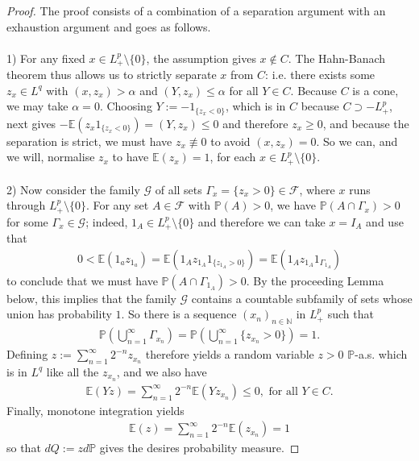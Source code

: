 \documentclass[12pt,a4paper, twoside]{article}
\theoremstyle{definition}
\newcommand{\EE}{\mathbb{E}} %
\newcommand{\PP}{\mathbb{P}} %
\begin{document}
\begin{proof}
The proof consists of a combination of a separation argument with an exhaustion argument and goes as follows. \\
\\
1) For any fixed $x \in L_+^p \setminus \{0\}$, the assumption gives $x \notin C$. The Hahn-Banach theorem thus allows us to strictly separate $x$ from $C$: i.e. there exists some $z_x \in L^q$ with $(x, z_x) > \alpha$ and $(Y, z_x) \leq \alpha$ for all $Y \in C$. Because $C$ is a cone,  we may take $\alpha = 0$. Choosing $Y:= -1_{\{ z_x < 0\}}$, which is in $C$ because $C \supset -L_+^p$, next gives $- \EE(z_x 1_{\{ z_x < 0\}})=(Y,z_x) \leq 0$ and therefore $z_x \geq 0$, and because the separation is strict,  we must have $z_x \not\equiv 0$ to avoid $(x, z_x)=0$. So we can, and we will, normalise $z_x$ to have $\EE(z_x)=1$, for each $x \in L_+^p \setminus \{0\}$. 
\\\\
2) Now consider the family $\mathcal{G}$ of all sets $\Gamma_x= \{ z_x >0\} \in \mathcal{F}$, where $x$ runs through $L_+^p \setminus \{0\}$. For any set $A \in \mathcal{F}$ with $\PP(A) >0$, we have $\PP(A \cap \Gamma_x) >0$ for some $\Gamma_x \in \mathcal{G}$; indeed, $1_A \in L_+^p \setminus \{0\}$ and therefore we can take $x= I_A$ and use that 
\begin{align*}
0 < \EE(1_a z_{1_a}) = \EE(1_A z_{1_A} 1_{\{ z_{1_A}>0\}}) = \EE(1_A z_{1_A} 1_{ \Gamma_{1_A}})
\end{align*}
to conclude that we must have $\PP(A \cap \Gamma_{1_A}) >0$. By the proceeding Lemma below, this implies that the family $\mathcal{G}$ contains a countable subfamily of sets whose union has probability $1$. So there is a sequence $(x_n)_{n \in \mathbb{N}}$ in $L_+^p$ such that 
\begin{align*}
\PP \left( \bigcup_{n=1}^\infty \Gamma_{x_n} \right) = \PP \left( \bigcup_{n=1}^\infty \{ z_{x_n} >0\} \right) =1.
\end{align*}
Defining $z:= \sum_{n=1}^\infty 2^{-n} z_{x_n}$ therefore yields a random variable $z>0$ $\PP$-a.s. which is in $L^q$ like all the $z_{x_n}$, and we also have 
\begin{align*}
\EE(Yz) = \sum_{n=1}^\infty 2^{-n} \EE(Y z_{x_n} ) \leq 0, \text{ for all } Y \in C. 
\end{align*}
Finally, monotone integration yields
\begin{align*}
\EE(z) = \sum_{n=1}^\infty 2^{-n} \EE(z_{x_n}) =1
\end{align*}
so that $dQ:= z d \PP$ gives the desires probability measure.
\end{proof}
\end{document}
